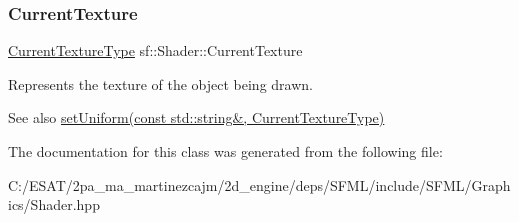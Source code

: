 \subsubsection{\texorpdfstring{Current\+Texture}{CurrentTexture}}
{\footnotesize\ttfamily \hyperlink{structsf_1_1_shader_1_1_current_texture_type}{Current\+Texture\+Type} sf\+::\+Shader\+::\+Current\+Texture\hspace{0.3cm}{\ttfamily [static]}}



Represents the texture of the object being drawn. 

\begin{DoxySeeAlso}{See also}
\hyperlink{classsf_1_1_shader_ab18f531e1f726b88fec1cf5a1e6af26d}{set\+Uniform(const std\+::string\&, Current\+Texture\+Type)} 
\end{DoxySeeAlso}


The documentation for this class was generated from the following file\+:\begin{DoxyCompactItemize}
\item 
C\+:/\+E\+S\+A\+T/2pa\+\_\+ma\+\_\+martinezcajm/2d\+\_\+engine/deps/\+S\+F\+M\+L/include/\+S\+F\+M\+L/\+Graphics/Shader.\+hpp\end{DoxyCompactItemize}
